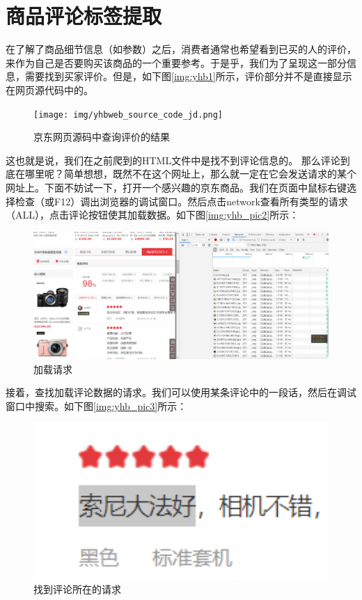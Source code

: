 \section{商品评论标签提取}
在了解了商品细节信息（如参数）之后，消费者通常也希望看到已买的人的评价，来作为自己是否要购买该商品的一个重要参考。于是乎，我们为了呈现这一部分信息，需要找到买家评价。但是，如下图\ref{img:yhb1}所示，评价部分并不是直接显示在网页源代码中的。

\begin{figure}[htbp]
\centering
\texttt{[image: img/yhbweb\_source\_code\_jd.png]}
\caption{京东网页源码中查询评价的结果} %
\label{img:yhb_pict1}   %
\end{figure}

这也就是说，我们在之前爬到的HTML文件中是找不到评论信息的。
那么评论到底在哪里呢？简单想想，既然不在这个网址上，那么就一定在它会发送请求的某个网址上。下面不妨试一下，打开一个感兴趣的京东商品。我们在页面中鼠标右键选择检查（或F12）调出浏览器的调试窗口。然后点击network查看所有类型的请求（ALL），点击评论按钮使其加载数据。如下图\ref{img:yhb_pic2}所示：

\begin{figure}[htbp]
\centering
\includegraphics[width=13.5cm]{network jd.png}
\caption{加载请求} %
\label{img:yhb_pict2}   %
\end{figure}

接着，查找加载评论数据的请求。我们可以使用某条评论中的一段话，然后在调试窗口中搜索。如下图\ref{img:yhb_pic3}所示：
\begin{figure}[htbp]
\centering
\includegraphics[width=13.5cm]{find request jd.png}
\caption{找到评论所在的请求} %
\label{img:yhb_pict3}   %
\end{figure}

